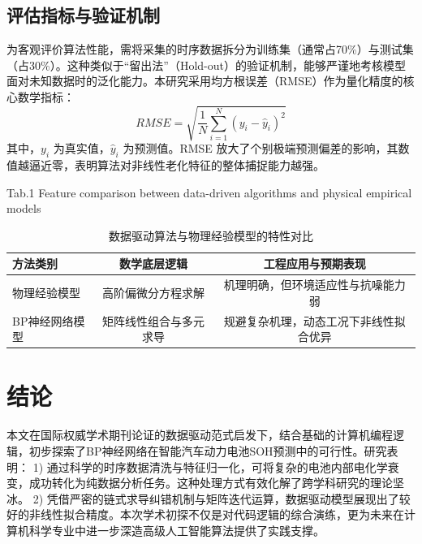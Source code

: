 \documentclass[a4paper,10.5pt]{article}
\begin{document}
\subsection{评估指标与验证机制}
为客观评价算法性能，需将采集的时序数据拆分为训练集（通常占70\%）与测试集（占30\%）。这种类似于“留出法”（Hold-out）的验证机制，能够严谨地考核模型面对未知数据时的泛化能力。本研究采用均方根误差（RMSE）作为量化精度的核心数学指标：
\begin{equation}
    RMSE=\sqrt{\frac{1}{N}\sum_{i=1}^{N}(y_{i}-\hat{y}_{i})^{2}}
\end{equation}
其中，$y_{i}$ 为真实值，$\hat{y}_{i}$ 为预测值。RMSE 放大了个别极端预测偏差的影响，其数值越逼近零，表明算法对非线性老化特征的整体捕捉能力越强。

\begin{table}[htbp]
    \centering
    \caption{数据驱动算法与物理经验模型的特性对比}
    \centerline{ Tab.1 Feature comparison between data-driven algorithms and physical empirical models}
    \vspace{0.5em}
    \begin{tabular}{lcc}
        \toprule
        方法类别     & 数学底层逻辑      & 工程应用与预期表现           \\
        \midrule
        物理经验模型   & 高阶偏微分方程求解   & 机理明确，但环境适应性与抗噪能力弱   \\
        BP神经网络模型 & 矩阵线性组合与多元求导 & 规避复杂机理，动态工况下非线性拟合优异 \\
        \bottomrule
    \end{tabular}
\end{table}

\section{结论}

本文在国际权威学术期刊论证的数据驱动范式启发下，结合基础的计算机编程逻辑，初步探索了BP神经网络在智能汽车动力电池SOH预测中的可行性。研究表明：
1) 通过科学的时序数据清洗与特征归一化，可将复杂的电池内部电化学衰变，成功转化为纯数据分析任务。这种处理方式有效化解了跨学科研究的理论坚冰。
2) 凭借严密的链式求导纠错机制与矩阵迭代运算，数据驱动模型展现出了较好的非线性拟合精度。本次学术初探不仅是对代码逻辑的综合演练，更为未来在计算机科学专业中进一步深造高级人工智能算法提供了实践支撑。

\vspace{2em}
\end{document}
